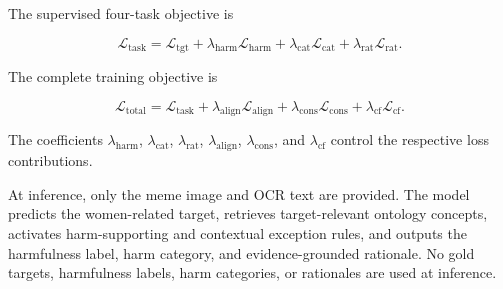 \documentclass[11pt]{article}
\begin{document}
The supervised four-task objective is

\begin{equation}
\mathcal{L}_{\mathrm{task}}
=
\mathcal{L}_{\mathrm{tgt}}
+
\lambda_{\mathrm{harm}}
\mathcal{L}_{\mathrm{harm}}
+
\lambda_{\mathrm{cat}}
\mathcal{L}_{\mathrm{cat}}
+
\lambda_{\mathrm{rat}}
\mathcal{L}_{\mathrm{rat}}.
\label{eq:task-objective}
\end{equation}

The complete training objective is

\begin{equation}
\mathcal{L}_{\mathrm{total}}
=
\mathcal{L}_{\mathrm{task}}
+
\lambda_{\mathrm{align}}
\mathcal{L}_{\mathrm{align}}
+
\lambda_{\mathrm{cons}}
\mathcal{L}_{\mathrm{cons}}
+
\lambda_{\mathrm{cf}}
\mathcal{L}_{\mathrm{cf}}.
\label{eq:total-objective}
\end{equation}

The coefficients $\lambda_{\mathrm{harm}}$,
$\lambda_{\mathrm{cat}}$, $\lambda_{\mathrm{rat}}$,
$\lambda_{\mathrm{align}}$, $\lambda_{\mathrm{cons}}$, and
$\lambda_{\mathrm{cf}}$ control the respective loss contributions.

At inference, only the meme image and OCR text are provided. The model
predicts the women-related target, retrieves target-relevant ontology
concepts, activates harm-supporting and contextual exception rules,
and outputs the harmfulness label, harm category, and
evidence-grounded rationale. No gold targets, harmfulness labels, harm
categories, or rationales are used at inference.






\end{document}

